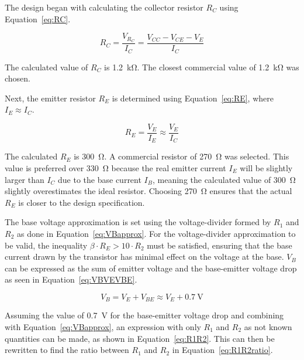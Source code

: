 \documentclass{article}
\begin{document}
The design began with calculating the collector resistor \(R_C\) using Equation~\ref{eq:RC}.



\begin{equation}
    \label{eq:RC}
    R_C = \frac{V_{R_C}}{I_C} = \frac{V_{CC} - V_{CE} - V_E}{I_C}
\end{equation}

The calculated value of \(R_C\) is \SI{1.2}{\kilo\ohm}.  
The closest commercial value of \SI{1.2}{\kilo\ohm} was chosen.

Next, the emitter resistor \(R_E\) is determined using Equation~\ref{eq:RE}, where \(I_E \approx I_C\).

\begin{equation}
    \label{eq:RE}
    R_E = \frac{V_E}{I_E} \approx \frac{V_E}{I_C}
\end{equation}

The calculated \(R_E\) is \SI{300}{\ohm}.  
A commercial resistor of \SI{270}{\ohm} was selected.
This value is preferred over \SI{330}{\ohm} because the real emitter current \(I_E\) will be slightly larger than \(I_C\) due to the base current \(I_B\), meaning the calculated value of \SI{300}{\ohm} slightly overestimates the ideal resistor.  
Choosing \SI{270}{\ohm} ensures that the actual \(R_E\) is closer to the design specification.  

The base voltage approximation is set using the voltage-divider formed by \(R_1\) and \(R_2\) as done in Equation~\ref{eq:VBapprox}.
For the voltage-divider approximation to be valid, the inequality \(\beta \cdot R_E > 10 \cdot R_2\) must be satisfied, ensuring that the base current drawn by the transistor has minimal effect on the voltage at the base.  
\(V_B\) can be expressed as the sum of emitter voltage and the base-emitter voltage drop as seen in Equation~\ref{eq:VBVEVBE}.

\begin{equation}
    \label{eq:VBVEVBE}
    V_B = V_E + V_{BE} \approx V_E + \SI{0.7}{\volt}
\end{equation}

Assuming the value of \SI{0.7}{\volt} for the base-emitter voltage drop and combining with Equation~\ref{eq:VBapprox}, an expression with only \(R_1\) and \(R_2\) as not known quantities can be made, as shown in Equation~\ref{eq:R1R2}.
This can then be rewritten to find the ratio between \(R_1\) and \(R_2\) in Equation~\ref{eq:R1R2ratio}.
\end{document}
